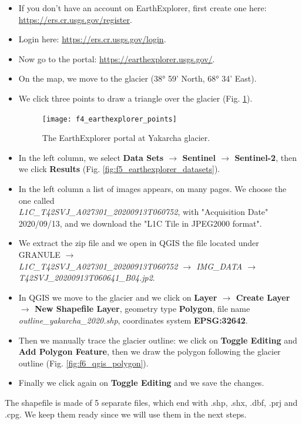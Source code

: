 \documentclass[15pt]{extarticle}
\begin{document}
\begin{itemize}
    \item If you don't have an account on EarthExplorer, first create one here: \href{https://ers.cr.usgs.gov/register}{https://ers.cr.usgs.gov/register}.
    \item Login here: \href{https://ers.cr.usgs.gov/login}{https://ers.cr.usgs.gov/login}.
    \item Now go to the portal: \href{https://earthexplorer.usgs.gov/}{https://earthexplorer.usgs.gov/}.
    \item On the map, we move to the glacier (38° 59' North, 68° 34' East).
    \item We click three points to draw a triangle over the glacier (Fig. \ref{fig:f4_earthexplorer_points}).

    \begin{figure}[h!]
    \centering
    \texttt{[image: f4\_earthexplorer\_points]}
    \caption{The EarthExplorer portal at Yakarcha glacier.}
    \label{fig:f4_earthexplorer_points}
    \end{figure}

    \item In the left column, we select \textbf{Data Sets $\rightarrow$ Sentinel $\rightarrow$ Sentinel-2}, then we click \textbf{Results} (Fig. \ref{fig:f5_earthexplorer_datasets}).
    \item In the left column a list of images appears, on many pages. We choose the one called\\ \textit{L1C\_T42SVJ\_A027301\_20200913T060752}, with "Acquisition Date" 2020/09/13, and we download the "L1C Tile in JPEG2000 format".
    \item We extract the zip file and we open in QGIS the file located under GRANULE \textit{$\rightarrow$ \\ L1C\_T42SVJ\_A027301\_20200913T060752 $\rightarrow$ IMG\_DATA $\rightarrow$ T42SVJ\_20200913T060641\_B04.jp2}.
    \item In QGIS we move to the glacier and we click on \textbf{Layer $\rightarrow$ Create Layer $\rightarrow$ New Shapefile Layer}, geometry type \textbf{Polygon}, file name \textit{outline\_yakarcha\_2020.shp}, coordinates system \textbf{EPSG:32642}.
    \item Then we manually trace the glacier outline: we click on \textbf{Toggle Editing} and \textbf{Add Polygon Feature}, then we draw the polygon following the glacier outline (Fig. \ref{fig:f6_qgis_polygon}).
    \item Finally we click again on \textbf{Toggle Editing} and we save the changes.
\end{itemize}
The shapefile is made of 5 separate files, which end with .shp, .shx, .dbf, .prj and .cpg. We keep them ready since we will use them in the next steps.
\end{document}
